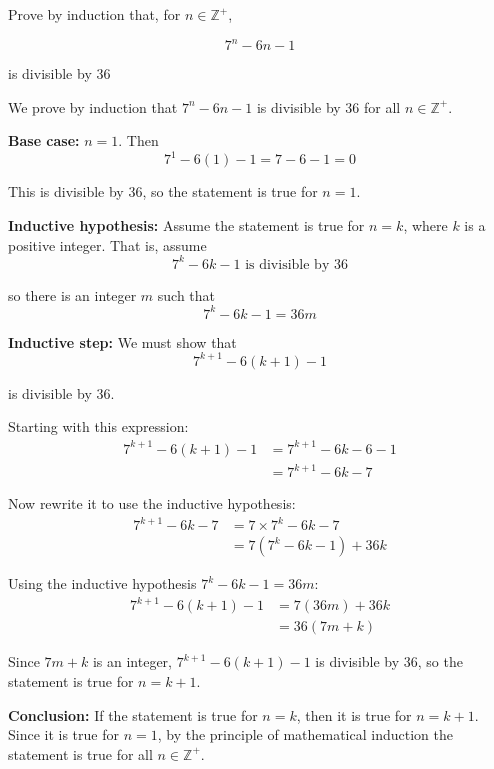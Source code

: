 \documentclass[leqno]{article}
\begin{document}
\begin{enumerate}[
  label=\textbf{\arabic*.},
  leftmargin=*,
  topsep=0pt,
  partopsep=0pt,
  parsep=0pt
]
\newpage

\questionitem

Prove by induction that, for $n \in \mathbb{Z}^+$,

\[
7^n-6n-1
\]

is divisible by $36$ 

\vspace*{10pt}

\begin{djsSolution}
We prove by induction that \(7^n-6n-1\) is divisible by \(36\) for all \(n\in\mathbb{Z}^+\).

\textbf{Base case:} \(n=1\). Then
\[
7^1-6(1)-1=7-6-1=0
\]

This is divisible by \(36\), so the statement is true for \(n=1\).

\textbf{Inductive hypothesis:} Assume the statement is true for \(n=k\), where \(k\) is a positive integer. That is, assume
\[
7^k-6k-1 \text{ is divisible by } 36
\]

so there is an integer \(m\) such that
\[
7^k-6k-1=36m
\]

\textbf{Inductive step:} We must show that
\[
7^{k+1}-6(k+1)-1
\]

is divisible by \(36\).

Starting with this expression:
\begin{align*}
7^{k+1}-6(k+1)-1
&=7^{k+1}-6k-6-1\\
&=7^{k+1}-6k-7
\end{align*}

Now rewrite it to use the inductive hypothesis:
\begin{align*}
7^{k+1}-6k-7
&=7\times 7^k-6k-7\\
&=7(7^k-6k-1)+36k
\end{align*}

Using the inductive hypothesis \(7^k-6k-1=36m\):
\begin{align*}
7^{k+1}-6(k+1)-1
&=7(36m)+36k\\
&=36(7m+k)
\end{align*}

Since \(7m+k\) is an integer, \(7^{k+1}-6(k+1)-1\) is divisible by \(36\), so the statement is true for \(n=k+1\).

\textbf{Conclusion:} If the statement is true for \(n=k\), then it is true for \(n=k+1\). Since it is true for \(n=1\), by the principle of mathematical induction the statement is true for all \(n\in\mathbb{Z}^+\).
\end{djsSolution}



\end{enumerate}
\end{document}
